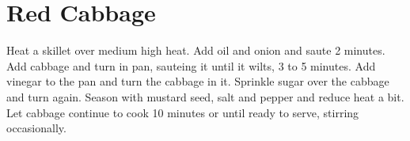 \section{Red Cabbage}
\begin{recipe}
	\yieldsourcetime{}{}{}

	\pre{}




Heat a skillet over medium high heat. Add oil and onion and saute 2 minutes. Add cabbage and turn in pan, sauteing it until it wilts, 3 to 5 minutes. Add vinegar to the pan and turn the cabbage in it. Sprinkle sugar over the cabbage and turn again. Season with mustard seed, salt and pepper and reduce heat a bit. Let cabbage continue to cook 10 minutes or until ready to serve, stirring occasionally.



\end{recipe}

